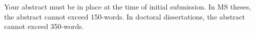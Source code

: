 Your abstract must be in place at the time of initial submission. In MS theses, the
abstract cannot exceed 150-words. In doctoral dissertations, the abstract cannot exceed 350-words.

